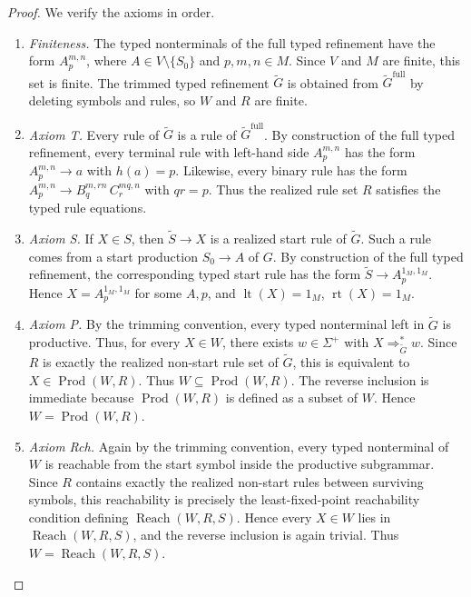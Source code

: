 \documentclass[sub]{jalc}
\newcommand{\lt}{\operatorname{lt}}
\newcommand{\rt}{\operatorname{rt}}
\newcommand{\eM}{1_M}
\newcommand{\Prod}{\operatorname{Prod}}
\newcommand{\Reach}{\operatorname{Reach}}
\newcommand{\Gfull}{\widetilde G^{\mathrm{full}}}
\newcommand{\Gtrim}{\widetilde G}
\begin{document}
\begin{proof}
We verify the axioms in order.

\begin{enumerate}[label=\textup{(\arabic*)},leftmargin=2.4em]
\item \emph{Finiteness.} The typed nonterminals of the full typed refinement have the form \(A_p^{m,n}\), where \(A\in V\setminus\{S_0\}\) and \(p,m,n\in M\). Since \(V\) and \(M\) are finite, this set is finite. The trimmed typed refinement \(\Gtrim\) is obtained from \(\Gfull\) by deleting symbols and rules, so \(W\) and \(R\) are finite.

\item \emph{Axiom T.} Every rule of \(\Gtrim\) is a rule of \(\Gfull\). By construction of the full typed refinement, every terminal rule with left-hand side \(A_p^{m,n}\) has the form \(A_p^{m,n}\to a\) with \(h(a)=p\). Likewise, every binary rule has the form \(A_p^{m,n}\to B_q^{m,rn}\,C_r^{mq,n}\) with \(qr=p\). Thus the realized rule set \(R\) satisfies the typed rule equations.

\item \emph{Axiom S.} If \(X\in S\), then \(\widetilde S\to X\) is a realized start rule of \(\Gtrim\). Such a rule comes from a start production \(S_0\to A\) of \(G\). By construction of the full typed refinement, the corresponding typed start rule has the form \(\widetilde S\to A_p^{\eM,\eM}\). Hence \(X=A_p^{\eM,\eM}\) for some \(A,p\), and \(\lt(X)=\eM\), \(\rt(X)=\eM\).

\item \emph{Axiom P.} By the trimming convention, every typed nonterminal left in \(\Gtrim\) is productive. Thus, for every \(X\in W\), there exists \(w\in\Sigma^+\) with \(X\Rightarrow_{\Gtrim}^*w\). Since \(R\) is exactly the realized non-start rule set of \(\Gtrim\), this is equivalent to \(X\in\Prod(W,R)\). Thus \(W\subseteq\Prod(W,R)\). The reverse inclusion is immediate because \(\Prod(W,R)\) is defined as a subset of \(W\). Hence \(W=\Prod(W,R)\).

\item \emph{Axiom Rch.} Again by the trimming convention, every typed nonterminal of \(W\) is reachable from the start symbol inside the productive subgrammar. Since \(R\) contains exactly the realized non-start rules between surviving symbols, this reachability is precisely the least-fixed-point reachability condition defining \(\Reach(W,R,S)\). Hence every \(X\in W\) lies in \(\Reach(W,R,S)\), and the reverse inclusion is again trivial. Thus \(W=\Reach(W,R,S)\).


\end{enumerate}
\end{proof}
\end{document}
